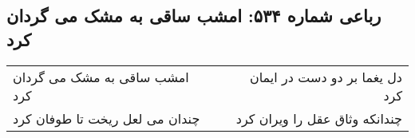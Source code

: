\begin{center}
\section*{رباعی شماره ۵۳۴: امشب ساقی به مشک می گردان کرد}
\label{sec:0534}
\begin{longtable}{l p{0.5cm} r}
امشب ساقی به مشک می گردان کرد
&&
دل یغما بر دو دست در ایمان کرد
\\
چندان می لعل ریخت تا طوفان کرد
&&
چندانکه وثاق عقل را ویران کرد
\\
\end{longtable}
\end{center}
